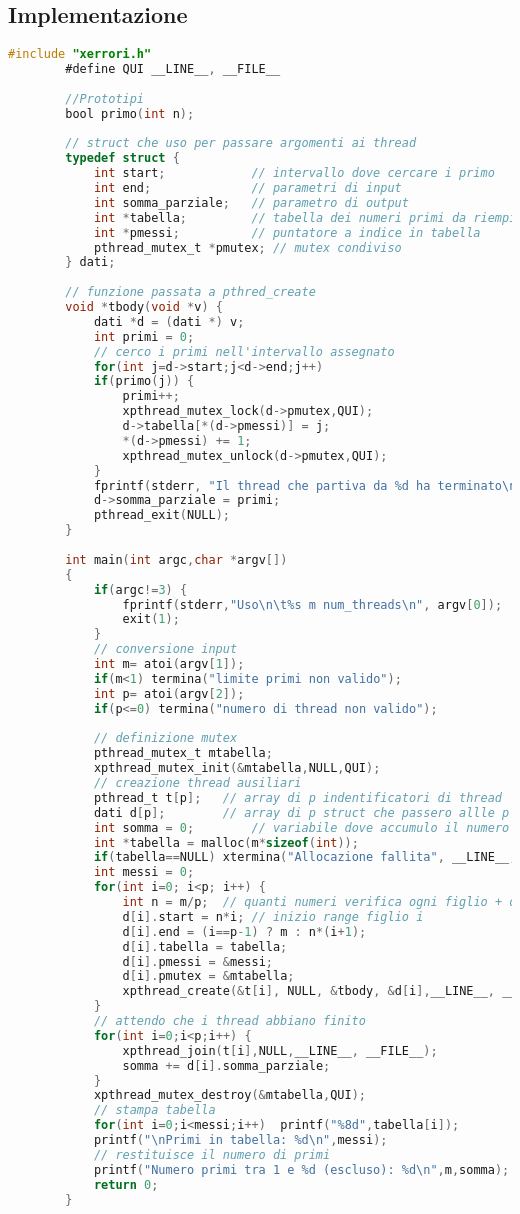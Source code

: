 \subsection{Implementazione}
\begin{example}
	\label{example:primetable}
	\begin{lstlisting}[language=C]
		#include "xerrori.h"
		#define QUI __LINE__, __FILE__
		
		//Prototipi
		bool primo(int n);
		
		// struct che uso per passare argomenti ai thread
		typedef struct {
			int start;            // intervallo dove cercare i primo 
			int end;              // parametri di input
			int somma_parziale;   // parametro di output
			int *tabella;         // tabella dei numeri primi da riempire
			int *pmessi;          // puntatore a indice in tabella
			pthread_mutex_t *pmutex; // mutex condiviso
		} dati;
		
		// funzione passata a pthred_create
		void *tbody(void *v) {
			dati *d = (dati *) v;
			int primi = 0;
			// cerco i primi nell'intervallo assegnato
			for(int j=d->start;j<d->end;j++)
			if(primo(j)) {
				primi++;
				xpthread_mutex_lock(d->pmutex,QUI);
				d->tabella[*(d->pmessi)] = j;
				*(d->pmessi) += 1;
				xpthread_mutex_unlock(d->pmutex,QUI);
			}
			fprintf(stderr, "Il thread che partiva da %d ha terminato\n", d->start);
			d->somma_parziale = primi;
			pthread_exit(NULL);
		}
		
		int main(int argc,char *argv[])
		{
			if(argc!=3) {
				fprintf(stderr,"Uso\n\t%s m num_threads\n", argv[0]);
				exit(1);
			}
			// conversione input
			int m= atoi(argv[1]);
			if(m<1) termina("limite primi non valido");
			int p= atoi(argv[2]);
			if(p<=0) termina("numero di thread non valido");
			
			// definizione mutex
			pthread_mutex_t mtabella;
			xpthread_mutex_init(&mtabella,NULL,QUI);
			// creazione thread ausiliari
			pthread_t t[p];   // array di p indentificatori di thread 
			dati d[p];        // array di p struct che passero allle p thread
			int somma = 0;        // variabile dove accumulo il numero di primi
			int *tabella = malloc(m*sizeof(int));
			if(tabella==NULL) xtermina("Allocazione fallita", __LINE__, __FILE__);
			int messi = 0;
			for(int i=0; i<p; i++) {
				int n = m/p;  // quanti numeri verifica ogni figlio + o - 
				d[i].start = n*i; // inizio range figlio i
				d[i].end = (i==p-1) ? m : n*(i+1);
				d[i].tabella = tabella;
				d[i].pmessi = &messi;
				d[i].pmutex = &mtabella;
				xpthread_create(&t[i], NULL, &tbody, &d[i],__LINE__, __FILE__); 
			}
			// attendo che i thread abbiano finito
			for(int i=0;i<p;i++) {
				xpthread_join(t[i],NULL,__LINE__, __FILE__);
				somma += d[i].somma_parziale;
			}
			xpthread_mutex_destroy(&mtabella,QUI);
			// stampa tabella
			for(int i=0;i<messi;i++)  printf("%8d",tabella[i]);
			printf("\nPrimi in tabella: %d\n",messi);
			// restituisce il numero di primi
			printf("Numero primi tra 1 e %d (escluso): %d\n",m,somma);
			return 0;
		}
	\end{lstlisting}
\end{example}

